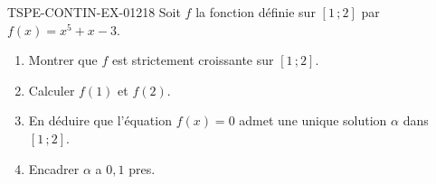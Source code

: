 \begin{exercice}{TSPE-CONTIN-EX-012}{1}{8}
Soit $f$ la fonction définie sur $[1\,;2]$ par $f(x) = x^5 + x - 3$.
\begin{enumerate}
  \item Montrer que $f$ est strictement croissante sur $[1\,;2]$.
  \item Calculer $f(1)$ et $f(2)$.
  \item En déduire que l'équation $f(x) = 0$ admet une unique solution $\alpha$ dans $[1\,;2]$.
  \item Encadrer $\alpha$ a $0{,}1$ pres.
\end{enumerate}
\end{exercice}
